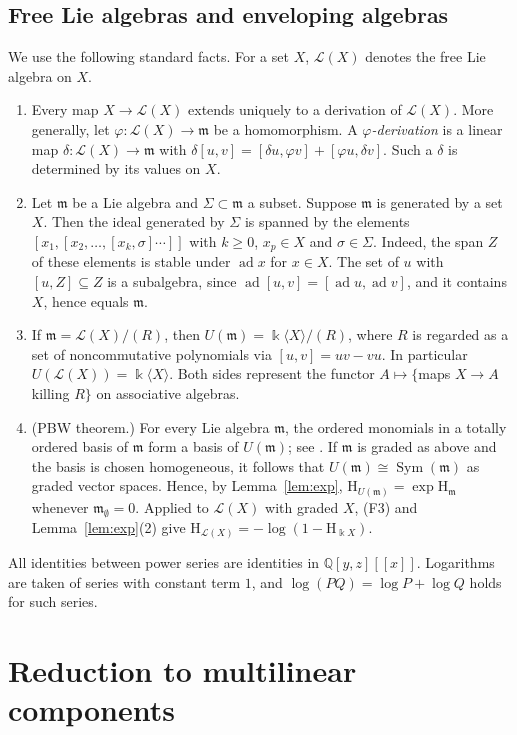\documentclass[11pt]{amsart}
\theoremstyle{definition}
\theoremstyle{remark}
\newcommand{\Q}{\mathbb{Q}}
\newcommand{\kk}{\Bbbk}
\newcommand{\Lf}{\mathcal{L}}
\newcommand{\ad}{\operatorname{ad}}
\newcommand{\Hs}{\mathrm{H}}
\newcommand{\Sym}{\operatorname{Sym}}
\begin{document}
\subsection{Free Lie algebras and enveloping algebras}
We use the following standard facts. For a set $X$, $\Lf(X)$ denotes the free Lie algebra on $X$.
\begin{enumerate}
\item[(F1)] Every map $X\to\Lf(X)$ extends uniquely to a derivation of $\Lf(X)$. More generally, let $\varphi\colon\Lf(X)\to\mathfrak m$ be a homomorphism. A \emph{$\varphi$-derivation} is a linear map $\delta\colon\Lf(X)\to\mathfrak m$ with $\delta[u,v]=[\delta u,\varphi v]+[\varphi u,\delta v]$. Such a $\delta$ is determined by its values on $X$.
\item[(F2)] Let $\mathfrak m$ be a Lie algebra and $\Sigma\subset\mathfrak m$ a subset. Suppose $\mathfrak m$ is generated by a set $X$. Then the ideal generated by $\Sigma$ is spanned by the elements $[x_1,[x_2,\dots,[x_k,\sigma]\cdots]]$ with $k\ge0$, $x_p\in X$ and $\sigma\in\Sigma$. Indeed, the span $Z$ of these elements is stable under $\ad x$ for $x\in X$. The set of $u$ with $[u,Z]\subseteq Z$ is a subalgebra, since $\ad[u,v]=[\ad u,\ad v]$, and it contains $X$, hence equals $\mathfrak m$.
\item[(F3)] If $\mathfrak m=\Lf(X)/(R)$, then $U(\mathfrak m)=\kk\langle X\rangle/(R)$, where $R$ is regarded as a set of noncommutative polynomials via $[u,v]=uv-vu$. In particular $U(\Lf(X))=\kk\langle X\rangle$. Both sides represent the functor $A\mapsto\{$maps $X\to A$ killing $R\}$ on associative algebras.
\item[(F4)] (PBW theorem.) For every Lie algebra $\mathfrak m$, the ordered monomials in a totally ordered basis of $\mathfrak m$ form a basis of $U(\mathfrak m)$; see \cite[\S3]{Ber}. If $\mathfrak m$ is graded as above and the basis is chosen homogeneous, it follows that $U(\mathfrak m)\cong\Sym(\mathfrak m)$ as graded vector spaces. Hence, by Lemma~\ref{lem:exp}, $\Hs_{U(\mathfrak m)}=\exp\Hs_{\mathfrak m}$ whenever $\mathfrak m_\emptyset=0$. Applied to $\Lf(X)$ with graded $X$, (F3) and Lemma~\ref{lem:exp}(2) give $\Hs_{\Lf(X)}=-\log(1-\Hs_{\kk X})$.
\end{enumerate}
All identities between power series are identities in $\Q[y,z][[x]]$. Logarithms are taken of series with constant term $1$, and $\log(PQ)=\log P+\log Q$ holds for such series.

\section{Reduction to multilinear components}\label{sec:polar}
\end{document}
